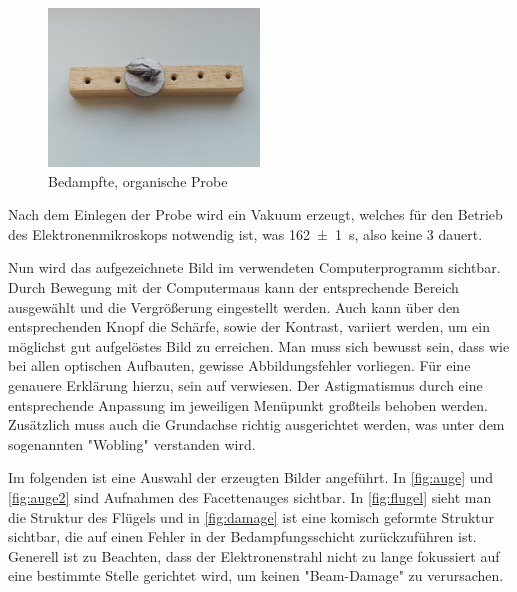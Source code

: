 \documentclass[12pt,english,ngerman]{scrartcl}
\begin{document}
\begin{figure}[H]
	\begin{center}
		\includegraphics[width =0.5\textwidth]{./figures/probe.png}
	\end{center}
	\caption[Bedampfte, organische Probe]
	{Bedampfte, organische Probe \cite{sein_foto}}
    \label{fig:probe}
\end{figure}

Nach dem Einlegen der Probe wird ein Vakuum erzeugt, welches für den Betrieb des Elektronenmikroskops notwendig ist, was 
\SI{162(1)}{\s}, also keine \SI{3}{\min} dauert.

Nun wird das aufgezeichnete Bild im verwendeten Computerprogramm sichtbar. Durch Bewegung mit der Computermaus kann 
der entsprechende Bereich ausgewählt und die Vergrößerung eingestellt werden. Auch kann über den entsprechenden Knopf die 
Schärfe, sowie der Kontrast, variiert werden, um ein möglichst gut aufgelöstes Bild zu erreichen. Man muss sich bewusst 
sein, dass wie bei allen
optischen Aufbauten, gewisse Abbildungsfehler vorliegen. Für eine genauere Erklärung hierzu, sein auf \cite{unterlagen} 
verwiesen. Der Astigmatismus durch eine entsprechende Anpassung im jeweiligen Menüpunkt großteils behoben werden.
Zusätzlich muss auch die Grundachse richtig ausgerichtet werden, was unter dem sogenannten "Wobling" verstanden wird.



Im folgenden ist eine Auswahl der erzeugten Bilder angeführt. In \autoref{fig:auge} und \autoref{fig:auge2} sind Aufnahmen
des Facettenauges sichtbar. In \autoref{fig:flugel} sieht man die Struktur des Flügels und in \autoref{fig:damage} ist eine
komisch geformte Struktur sichtbar, die auf einen Fehler in der Bedampfungsschicht zurückzuführen ist.
Generell ist zu Beachten, dass der Elektronenstrahl nicht zu lange fokussiert auf eine bestimmte Stelle gerichtet wird, um
keinen "Beam-Damage" zu verursachen.
\end{document}
